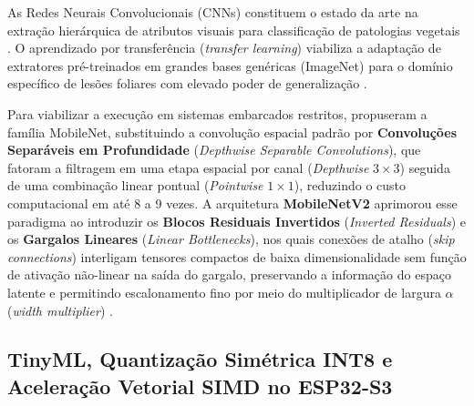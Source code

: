 \documentclass[12pt]{article}
\begin{document}
As Redes Neurais Convolucionais (CNNs) constituem o estado da arte na extração hierárquica de atributos visuais para classificação de patologias vegetais \parencite{krizhevsky2012,goodfellow2016}. O aprendizado por transferência (\textit{transfer learning}) viabiliza a adaptação de extratores pré-treinados em grandes bases genéricas (ImageNet) para o domínio específico de lesões foliares com elevado poder de generalização \parencite{yosinski2014}.

Para viabilizar a execução em sistemas embarcados restritos, \textcite{howard2017} propuseram a família MobileNet, substituindo a convolução espacial padrão por \textbf{Convoluções Separáveis em Profundidade} (\textit{Depthwise Separable Convolutions}), que fatoram a filtragem em uma etapa espacial por canal (\textit{Depthwise} $3 \times 3$) seguida de uma combinação linear pontual (\textit{Pointwise} $1 \times 1$), reduzindo o custo computacional em até 8 a 9 vezes. A arquitetura \textbf{MobileNetV2} \parencite{sandler2018} aprimorou esse paradigma ao introduzir os \textbf{Blocos Residuais Invertidos} (\textit{Inverted Residuals}) e os \textbf{Gargalos Lineares} (\textit{Linear Bottlenecks}), nos quais conexões de atalho (\textit{skip connections}) interligam tensores compactos de baixa dimensionalidade sem função de ativação não-linear na saída do gargalo, preservando a informação do espaço latente e permitindo escalonamento fino por meio do multiplicador de largura $\alpha$ (\textit{width multiplier}) \parencite{sandler2018,howard2019searching}.

\subsection{TinyML, Quantização Simétrica INT8 e Aceleração Vetorial SIMD no ESP32-S3}
\end{document}
